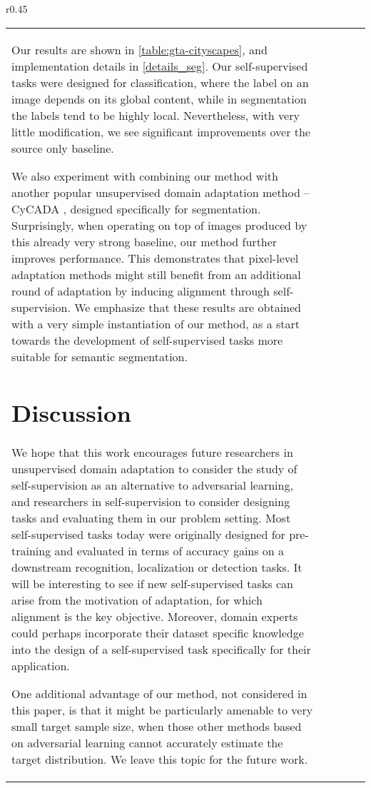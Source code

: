 \documentclass{article} \usepackage{iclr2020_conference,times}
\begin{document}
\begin{wraptable}{r}{0.45\textwidth}
\begin{tabular}{lcccc}
Our results are shown in \autoref{table:gta-cityscapes}, and implementation details in \autoref{details_seg}.
Our self-supervised tasks were designed for classification, where the label on an image depends on its global content, 
while in segmentation the labels tend to be highly local.
Nevertheless, with very little modification, 
we see significant improvements over the source only baseline.

We also experiment with combining our method with another popular unsupervised domain adaptation method --  CyCADA \citep{hoffman2017cycada}, designed specifically for segmentation.
Surprisingly, when operating on top of images produced by this already very strong baseline, our method further improves performance.
This demonstrates that pixel-level adaptation methods might still benefit from an additional round of adaptation by inducing alignment through self-supervision.
We emphasize that these results are obtained with a very simple instantiation of our method, as a start towards the development of
self-supervised tasks more suitable for semantic segmentation.
  \section{Discussion}

We hope that this work encourages future researchers in unsupervised domain adaptation to consider the study of self-supervision as an alternative to adversarial learning, and researchers in self-supervision to consider designing tasks and evaluating them in our problem setting. 
Most self-supervised tasks today were originally designed for pre-training and evaluated in terms of accuracy gains on a downstream recognition, localization or detection tasks.
It will be interesting to see if new self-supervised tasks can arise from the motivation of adaptation, for which alignment is the key objective.  Moreover, domain experts could perhaps incorporate their dataset specific knowledge into the design of a self-supervised task specifically for their application.

One additional advantage of our method, not considered in this paper, is that it might be particularly amenable to very small target sample size, when those other methods based on adversarial learning cannot accurately estimate the target distribution. We leave this topic for the future work.
 



\newpage
\appendix

\end{tabular}
\end{wraptable}
\end{document}

